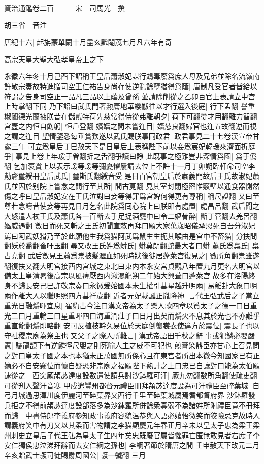 資治通鑑卷二百　　　宋　司馬光　撰

胡三省　音注

唐紀十六|{
	起旃蒙單閼十月盡玄黓閹茂七月凡六年有奇}


高宗天皇大聖大弘孝皇帝上之下

永徽六年冬十月己酉下詔稱王皇后蕭淑妃謀行鴆毒廢爲庶人母及兄弟並除名流嶺南許敬宗奏故特進贈司空王仁祐告身尚存使逆亂餘孽猶得爲䕃|{
	唐制凡受官者皆給以符謂之告身司空正一品凡三品以上䕃及曾孫}
並請除削從之乙卯百官上表請立中宫|{
	上時掌翻下同}
乃下詔曰武氏門著勲庸地華纓黻往以才行選入後庭|{
	行下孟翻}
譽重椒闈德光蘭掖朕昔在儲貳特荷先慈常得侍從弗離朝夕|{
	荷下可翻從才用翻離力智翻}
宫壼之内恒自飭躬|{
	恒戶登翻}
嬪嬙之間未嘗迕目|{
	嬙慈良翻婦官也迕五故翻逆而視之謂之迕目}
聖情鑒悉每垂賞歎遂以武氏賜朕事同政君|{
	政君事見二十七卷漢宣帝甘露三年}
可立爲皇后丁巳赦天下是日皇后上表稱陛下前以妾爲宸妃韓瑗來濟面折庭爭|{
	事見上卷上年瑗于眷翻折之舌翻爭讀曰諍}
此既事之極難豈非深情爲國|{
	爲于僞翻}
乞加褒賞上以表示瑗等瑗等彌憂懼屢請去位上不許十一月丁卯朔臨軒命司空李勣齎璽綬冊皇后武氏|{
	璽斯氏翻綬音受}
是日百官朝皇后於肅義門故后王氏故淑妃蕭氏並囚於别院上嘗念之閒行至其所|{
	間古莧翻}
見其室封閉極密惟竅壁以通食器惻然傷之呼曰皇后淑妃安在王氏泣對曰妾等得罪爲宫婢何得更有尊稱|{
	稱尺證翻}
又曰至尊若念疇昔使妾等再見日月乞名此院爲囘心院上曰朕即有處置|{
	處昌呂翻}
武后聞之大怒遣人杖王氏及蕭氏各一百斷去手足捉酒甕中曰令二嫗骨醉|{
	斷丁管翻去羌呂翻嫗威遇翻}
數日而死又斬之王氏初聞宣敕再拜曰願大家萬歲昭儀承恩死自吾分淑妃罵曰阿武妖猾乃至於此願他生我爲猫阿武爲鼠生生扼其喉由是宫中不畜猫|{
	分扶問翻妖於喬翻畜吁玉翻}
尋又改王氏姓爲蟒氏|{
	蟒莫朗翻蛇最大者曰蟒}
蕭氏爲梟氏|{
	梟古堯翻}
武后數見王蕭爲祟被髪瀝血如死時狀後徙居蓬萊宫復見之|{
	數所角翻祟雖遂翻復扶又翻大明宫接西内宫城之東北曰東内本永安宫貞觀八年置九月更名大明宫以備太上皇清暑後高宗以風痺厭西内湫濕龍朔二年始大興葺曰蓬萊宫}
故多在洛陽終身不歸長安己巳許敬宗奏曰永徽爰始國本未生權引彗星越升明兩|{
	易離卦大象曰明兩作離大人以繼明照四方彗祥歲翻}
近者元妃載誕正胤降神|{
	言代王弘武后之子當立}
重光日融爝暉宜息|{
	崔豹古今注曰漢文帝為太子樂人歌四章以贊太子之德一曰日重光二曰月重輪三曰星重暉四曰海重潤莊子曰日月出矣而爝火不息其於光也不亦難乎重直龍翻爝即略翻}
安可反植枝幹久易位於天庭倒襲裳衣使違方於震位|{
	震長子也以守社稷宗廟為祭主也}
又父子之際人所難言|{
	漢武帝語田千秋之辭}
事或犯鱗必嬰嚴憲|{
	驪龍頷下有逆鱗徑尺嬰之則死喻人主之威不可犯也}
煎膏染鼎臣亦甘心上召見問之對曰皇太子國之本也本猶未正萬國無所係心且在東宫者所出本微今知國家已有正嫡必不自安竊位而懷自疑恐非宗廟之福願陛下熟計之上曰忠已自讓對曰能為太伯願速從之　西突厥頡苾達度設數遣使請兵討沙鉢羅可汗|{
	厥九勿翻數所角翻使疏吏翻可從刋入聲汗音寒}
甲戍遣豐州都督元禮臣冊拜頡苾達度設為可汗禮臣至碎葉城|{
	自弓月城過思渾川度伊麗河至碎葉界又西行千里至碎葉城屬焉耆都督府界}
沙鉢羅發兵拒之不得前頡苾逹度設部落多為沙鉢羅所併餘衆寡弱不為諸姓所附禮臣竟不冊拜而歸　中書侍郎李義府參知政事義府容貌温恭與人語必嬉怡微笑而狡險忌克故時人謂義府笑中有刀又以其柔而害物謂之李猫顯慶元年春正月辛未以皇太子忠為梁王梁州刺史立皇后子代王弘為皇太子生四年矣忠既廢官屬皆懼罪亡匿無敢見者右庶子李安仁獨侯忠泣涕拜辭而去安仁綱之孫也|{
	李綱著節於隋唐之間}
壬申赦天下改元二月辛亥贈武士彠司徒賜爵周國公|{
	彠一虢翻}
三月

